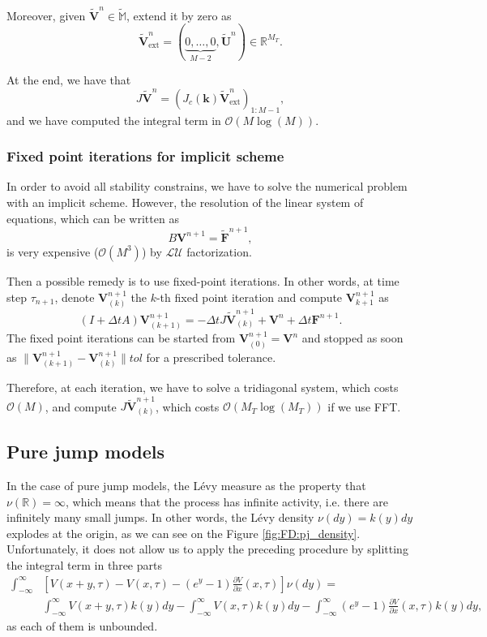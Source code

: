 Moreover, given $\mathbf{\tilde{V}}^n\in\mathbb{\tilde{M}}$, extend it by zero as
$$\mathbf{\tilde{V}}^n_{\text{ext}}=(\underbrace{0,\ldots,0}_{M-2},\mathbf{\tilde{U}}^n)\in \mathbb{R}^{M_T}.$$

At the end, we have that 
$$J\mathbf{\tilde{V}}^n = \left(J_c(\mathbf{k})\mathbf{\tilde{V}}^n_\text{ext}\right)_{1:M-1},$$
and we have computed the integral term in $\mathcal{O}(M\log(M))$.

\subsubsection{Fixed point iterations for implicit scheme}

In order to avoid all stability constrains, we have to solve the numerical problem with an implicit scheme. However, the resolution of the linear system of equations, which can be written as
$$B\mathbf{V}^{n+1}=\mathbf{\tilde{F}}^{n+1},$$
is very expensive ($\mathcal{O}(M^3)$) by $\mathcal{LU}$ factorization.

Then a possible remedy is to use fixed-point iterations. In other words, at time step $\tau_{n+1}$, denote $\mathbf{V}^{n+1}_{(k)}$ the $k$-th fixed point iteration and compute $\mathbf{V}^{n+1}_{k+1}$ as
$$(I+\Delta t A)\mathbf{V}^{n+1}_{(k+1)} = -\Delta t J\mathbf{\tilde{V}}^{n+1}_(k)+\mathbf{V}^n + \Delta t \mathbf{F}^{n+1}.$$
The fixed point iterations can be started from $\mathbf{V}^{n+1}_{(0)}=\mathbf{V}^n$ and stopped as soon as $\parallel\mathbf{V}^{n+1}_{(k+1)}-\mathbf{V}^{n+1}_{(k)}\parallel tol$ for a prescribed tolerance.

Therefore, at each iteration, we have to solve a tridiagonal system, which costs $\mathcal{O}(M)$, and compute $J\mathbf{\tilde{V}}^{n+1}_{(k)}$, which costs $\mathcal{O}(M_T \log(M_T))$ if we use FFT.

\subsection{Pure jump models}
In the case of pure jump models, the L\'evy measure as the property that $\nu(\mathbb{R})= \infty$, which means that the process has infinite activity, i.e. there are infinitely many small jumps. In other words, the L\'evy density $\nu(dy)=k(y)dy$ explodes at the origin, as we can see on the Figure \ref{fig:FD:pj_density}. Unfortunately, it does not allow us to apply the preceding procedure by splitting the integral term in three parts
\begin{align*}
\int_{-\infty}^\infty &\left[V(x+y,\tau)-V(x,\tau)-\left(e^y-1\right)\frac{\partial V}{\partial x}(x,\tau)\right]\nu(dy) = \\
&\int_{-\infty}^\infty V(x+y,\tau)k(y) dy -\int_{-\infty}^\infty V(x,\tau)k(y)dy-\int_{-\infty}^\infty\left(e^y-1\right)\frac{\partial V}{\partial x}(x,\tau)k(y)dy,
\end{align*}
as each of them is unbounded.

